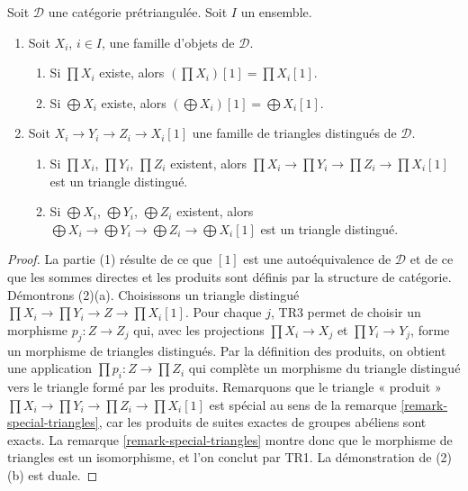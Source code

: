 \begin{lemma}
\label{lemma-products-sums-shifts-triangles}
Soit $\mathcal{D}$ une catégorie prétriangulée.
Soit $I$ un ensemble.
\begin{enumerate}
\item Soit $X_i$, $i \in I$, une famille d'objets de $\mathcal{D}$.
\begin{enumerate}
\item Si $\prod X_i$ existe, alors $(\prod X_i)[1] = \prod X_i[1]$.
\item Si $\bigoplus X_i$ existe, alors
$(\bigoplus X_i)[1] = \bigoplus X_i[1]$.
\end{enumerate}
\item Soit $X_i \to Y_i \to Z_i \to X_i[1]$ une famille de triangles
distingués de $\mathcal{D}$.
\begin{enumerate}
\item Si $\prod X_i$, $\prod Y_i$, $\prod Z_i$ existent, alors
$\prod X_i \to \prod Y_i \to \prod Z_i \to \prod X_i[1]$
est un triangle distingué.
\item Si $\bigoplus X_i$, $\bigoplus Y_i$,
$\bigoplus Z_i$ existent, alors
$\bigoplus X_i \to \bigoplus Y_i \to \bigoplus Z_i \to \bigoplus X_i[1]$
est un triangle distingué.
\end{enumerate}
\end{enumerate}
\end{lemma}

\begin{proof}
La partie (1) résulte de ce que $[1]$ est une autoéquivalence de $\mathcal{D}$
et de ce que les sommes directes et les produits sont définis par la structure
de catégorie. Démontrons (2)(a). Choisissons un triangle distingué
$\prod X_i \to \prod Y_i \to Z \to \prod X_i[1]$. Pour chaque $j$, TR3 permet
de choisir un morphisme $p_j : Z \to Z_j$ qui, avec les projections
$\prod X_i \to X_j$ et $\prod Y_i \to Y_j$, forme un morphisme de triangles
distingués. Par la définition des produits, on obtient une application
$\prod p_i : Z \to \prod Z_i$ qui complète un morphisme du triangle distingué
vers le triangle formé par les produits. Remarquons que le triangle « produit »
$\prod X_i \to \prod Y_i \to \prod Z_i \to \prod X_i[1]$
est spécial au sens de la remarque \ref{remark-special-triangles}, car les
produits de suites exactes de groupes abéliens sont exacts.
La remarque \ref{remark-special-triangles} montre donc que le morphisme de
triangles est un isomorphisme, et l'on conclut par TR1.
La démonstration de (2)(b) est duale.
\end{proof}

